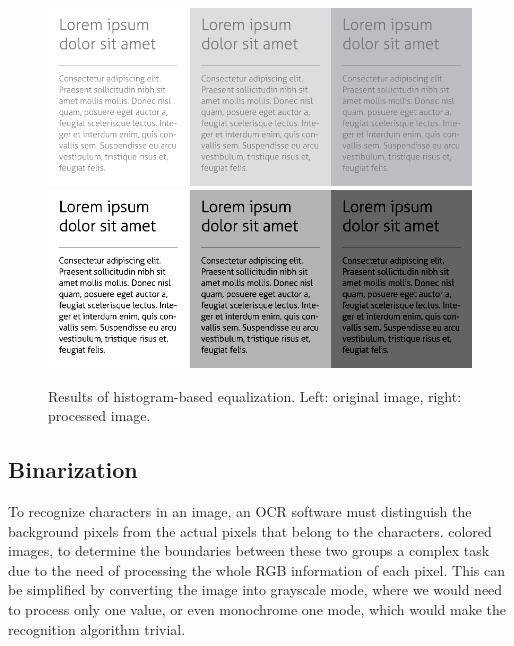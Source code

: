 \begin{figure}[t]
\centering
\includegraphics[width=0.4\linewidth]{img/preprocessing/contrast_low.png}
\qquad
\includegraphics[width=0.4\linewidth]{img/preprocessing/contrast_high.png}
\caption{Results of histogram-based equalization. Left: original image, right: processed image.}
\label{fig:preprocessHistogramEqualization}
\end{figure}

\subsection{Binarization} \label{binarization}

To recognize characters in an image, an OCR software must distinguish the background pixels from the actual pixels that belong to the characters.  colored images, to determine the boundaries between these two groups  a complex task due to the need of processing the whole RGB information of each pixel. This can be simplified by converting the image into grayscale mode, where we would need to process only one value, or even monochrome one mode, which would make the recognition algorithm trivial.


